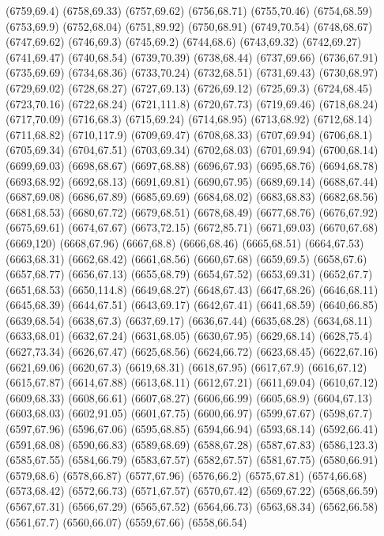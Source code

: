 (6759,69.4)
(6758,69.33)
(6757,69.62)
(6756,68.71)
(6755,70.46)
(6754,68.59)
(6753,69.9)
(6752,68.04)
(6751,89.92)
(6750,68.91)
(6749,70.54)
(6748,68.67)
(6747,69.62)
(6746,69.3)
(6745,69.2)
(6744,68.6)
(6743,69.32)
(6742,69.27)
(6741,69.47)
(6740,68.54)
(6739,70.39)
(6738,68.44)
(6737,69.66)
(6736,67.91)
(6735,69.69)
(6734,68.36)
(6733,70.24)
(6732,68.51)
(6731,69.43)
(6730,68.97)
(6729,69.02)
(6728,68.27)
(6727,69.13)
(6726,69.12)
(6725,69.3)
(6724,68.45)
(6723,70.16)
(6722,68.24)
(6721,111.8)
(6720,67.73)
(6719,69.46)
(6718,68.24)
(6717,70.09)
(6716,68.3)
(6715,69.24)
(6714,68.95)
(6713,68.92)
(6712,68.14)
(6711,68.82)
(6710,117.9)
(6709,69.47)
(6708,68.33)
(6707,69.94)
(6706,68.1)
(6705,69.34)
(6704,67.51)
(6703,69.34)
(6702,68.03)
(6701,69.94)
(6700,68.14)
(6699,69.03)
(6698,68.67)
(6697,68.88)
(6696,67.93)
(6695,68.76)
(6694,68.78)
(6693,68.92)
(6692,68.13)
(6691,69.81)
(6690,67.95)
(6689,69.14)
(6688,67.44)
(6687,69.08)
(6686,67.89)
(6685,69.69)
(6684,68.02)
(6683,68.83)
(6682,68.56)
(6681,68.53)
(6680,67.72)
(6679,68.51)
(6678,68.49)
(6677,68.76)
(6676,67.92)
(6675,69.61)
(6674,67.67)
(6673,72.15)
(6672,85.71)
(6671,69.03)
(6670,67.68)
(6669,120)
(6668,67.96)
(6667,68.8)
(6666,68.46)
(6665,68.51)
(6664,67.53)
(6663,68.31)
(6662,68.42)
(6661,68.56)
(6660,67.68)
(6659,69.5)
(6658,67.6)
(6657,68.77)
(6656,67.13)
(6655,68.79)
(6654,67.52)
(6653,69.31)
(6652,67.7)
(6651,68.53)
(6650,114.8)
(6649,68.27)
(6648,67.43)
(6647,68.26)
(6646,68.11)
(6645,68.39)
(6644,67.51)
(6643,69.17)
(6642,67.41)
(6641,68.59)
(6640,66.85)
(6639,68.54)
(6638,67.3)
(6637,69.17)
(6636,67.44)
(6635,68.28)
(6634,68.11)
(6633,68.01)
(6632,67.24)
(6631,68.05)
(6630,67.95)
(6629,68.14)
(6628,75.4)
(6627,73.34)
(6626,67.47)
(6625,68.56)
(6624,66.72)
(6623,68.45)
(6622,67.16)
(6621,69.06)
(6620,67.3)
(6619,68.31)
(6618,67.95)
(6617,67.9)
(6616,67.12)
(6615,67.87)
(6614,67.88)
(6613,68.11)
(6612,67.21)
(6611,69.04)
(6610,67.12)
(6609,68.33)
(6608,66.61)
(6607,68.27)
(6606,66.99)
(6605,68.9)
(6604,67.13)
(6603,68.03)
(6602,91.05)
(6601,67.75)
(6600,66.97)
(6599,67.67)
(6598,67.7)
(6597,67.96)
(6596,67.06)
(6595,68.85)
(6594,66.94)
(6593,68.14)
(6592,66.41)
(6591,68.08)
(6590,66.83)
(6589,68.69)
(6588,67.28)
(6587,67.83)
(6586,123.3)
(6585,67.55)
(6584,66.79)
(6583,67.57)
(6582,67.57)
(6581,67.75)
(6580,66.91)
(6579,68.6)
(6578,66.87)
(6577,67.96)
(6576,66.2)
(6575,67.81)
(6574,66.68)
(6573,68.42)
(6572,66.73)
(6571,67.57)
(6570,67.42)
(6569,67.22)
(6568,66.59)
(6567,67.31)
(6566,67.29)
(6565,67.52)
(6564,66.73)
(6563,68.34)
(6562,66.58)
(6561,67.7)
(6560,66.07)
(6559,67.66)
(6558,66.54)
